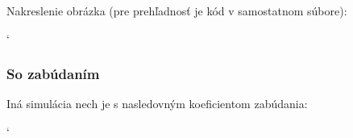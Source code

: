\documentclass[a4paper, 10pt, ]{article}
\begin{document}
\noindent
Nakreslenie obrázka (pre prehľadnosť je kód v samostatnom súbore):

{\catcode`

}



\begin{centering}


    \vspace{-2mm}

    \figcaption{}

    \vspace{2mm}

    \label{figsc_ar03_fig03_0}

\end{centering}








\subsubsection{So zabúdaním}


Iná simulácia nech je s nasledovným koeficientom zabúdania:


{\catcode`

}



\begin{centering}


    \vspace{-2mm}

    \figcaption{}

    \vspace{2mm}

    \label{figsc_ar03_fig03_1}

\end{centering}
\end{document}
